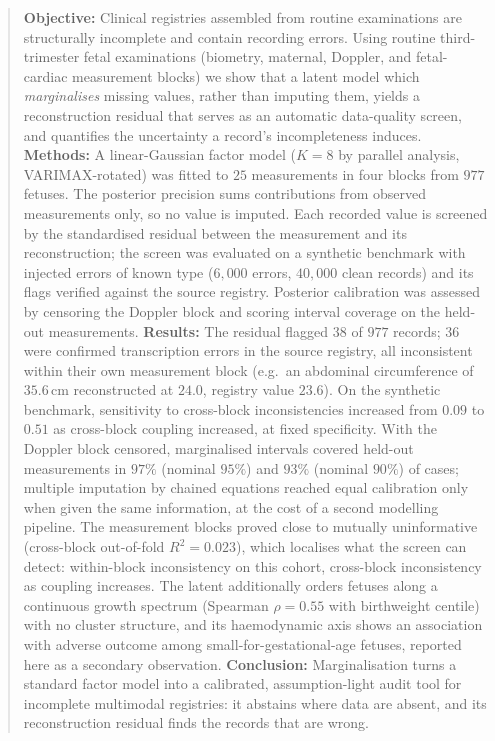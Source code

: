 \documentclass[a4paper,fleqn]{cas-sc}
\begin{document}
\begin{abstract}
\noindent\textbf{Objective:} Clinical registries assembled from routine examinations are structurally incomplete and contain recording errors. Using routine third-trimester fetal examinations (biometry, maternal, Doppler, and fetal-cardiac measurement blocks) we show that a latent model which \emph{marginalises} missing values, rather than imputing them, yields a reconstruction residual that serves as an automatic data-quality screen, and quantifies the uncertainty a record's incompleteness induces.
\noindent\textbf{Methods:} A linear-Gaussian factor model ($K=8$ by parallel analysis, VARIMAX-rotated) was fitted to $25$ measurements in four blocks from $977$ fetuses. The posterior precision sums contributions from observed measurements only, so no value is imputed. Each recorded value is screened by the standardised residual between the measurement and its reconstruction; the screen was evaluated on a synthetic benchmark with injected errors of known type ($6{,}000$ errors, $40{,}000$ clean records) and its flags verified against the source registry. Posterior calibration was assessed by censoring the Doppler block and scoring interval coverage on the held-out measurements.
\noindent\textbf{Results:} The residual flagged $38$ of $977$ records; $36$ were confirmed transcription errors in the source registry, all inconsistent within their own measurement block (e.g.\ an abdominal circumference of $35.6$\,cm reconstructed at $24.0$, registry value $23.6$). On the synthetic benchmark, sensitivity to cross-block inconsistencies increased from $0.09$ to $0.51$ as cross-block coupling increased, at fixed specificity. With the Doppler block censored, marginalised intervals covered held-out measurements in $97\%$ (nominal $95\%$) and $93\%$ (nominal $90\%$) of cases; multiple imputation by chained equations reached equal calibration only when given the same information, at the cost of a second modelling pipeline. The measurement blocks proved close to mutually uninformative (cross-block out-of-fold $R^2=0.023$), which localises what the screen can detect: within-block inconsistency on this cohort, cross-block inconsistency as coupling increases. The latent additionally orders fetuses along a continuous growth spectrum (Spearman $\rho = 0.55$ with birthweight centile) with no cluster structure, and its haemodynamic axis shows an association with adverse outcome among small-for-gestational-age fetuses, reported here as a secondary observation.
\noindent\textbf{Conclusion:} Marginalisation turns a standard factor model into a calibrated, assumption-light audit tool for incomplete multimodal registries: it abstains where data are absent, and its reconstruction residual finds the records that are wrong.
\end{abstract}
\end{document}
